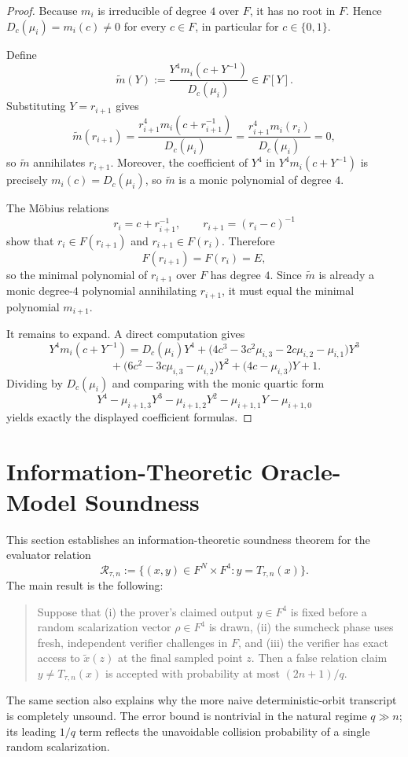 \documentclass[11pt]{article}
\begin{document}
\begin{proof}
Because \(m_i\) is irreducible of degree \(4\) over \(F\), it has no root in \(F\). Hence \(D_c(\mu_i)=m_i(c)\neq 0\) for every \(c\in F\), in particular for \(c\in\{0,1\}\).

Define
\[
\widetilde m(Y):=\frac{Y^4m_i(c+Y^{-1})}{D_c(\mu_i)}\in F[Y].
\]
Substituting \(Y=r_{i+1}\) gives
\[
\widetilde m(r_{i+1})
=
\frac{r_{i+1}^4 m_i(c+r_{i+1}^{-1})}{D_c(\mu_i)}
=
\frac{r_{i+1}^4 m_i(r_i)}{D_c(\mu_i)}
=0,
\]
so \(\widetilde m\) annihilates \(r_{i+1}\). Moreover, the coefficient of \(Y^4\) in \(Y^4m_i(c+Y^{-1})\) is precisely \(m_i(c)=D_c(\mu_i)\), so \(\widetilde m\) is a monic polynomial of degree \(4\).

The M\"obius relations
\[
r_i=c+r_{i+1}^{-1},
\qquad
r_{i+1}=(r_i-c)^{-1}
\]
show that \(r_i\in F(r_{i+1})\) and \(r_{i+1}\in F(r_i)\). Therefore
\[
F(r_{i+1})=F(r_i)=E,
\]
so the minimal polynomial of \(r_{i+1}\) over \(F\) has degree \(4\). Since \(\widetilde m\) is already a monic degree-\(4\) polynomial annihilating \(r_{i+1}\), it must equal the minimal polynomial \(m_{i+1}\).

It remains to expand. A direct computation gives
\[
Y^4m_i(c+Y^{-1})
=
D_c(\mu_i)Y^4
+
\bigl(4c^3-3c^2\mu_{i,3}-2c\mu_{i,2}-\mu_{i,1}\bigr)Y^3
\]
\[
\qquad
+
\bigl(6c^2-3c\mu_{i,3}-\mu_{i,2}\bigr)Y^2
+
\bigl(4c-\mu_{i,3}\bigr)Y
+1.
\]
Dividing by \(D_c(\mu_i)\) and comparing with the monic quartic form
\[
Y^4-\mu_{i+1,3}Y^3-\mu_{i+1,2}Y^2-\mu_{i+1,1}Y-\mu_{i+1,0}
\]
yields exactly the displayed coefficient formulas.
\end{proof}

\section{Information-Theoretic Oracle-Model Soundness}
\label{sec:it-soundness}

This section establishes an information-theoretic soundness theorem for the evaluator relation
\[
\mathcal R_{\tau,n}:=\{(x,y)\in F^N\times F^4 : y=T_{\tau,n}(x)\}.
\]
The main result is the following:
\begin{quote}
Suppose that (i) the prover's claimed output $y\in F^4$ is fixed before a random scalarization vector $\rho\in F^4$ is drawn, (ii) the sumcheck phase uses fresh, independent verifier challenges in $F$, and (iii) the verifier has exact access to $\widetilde x(z)$ at the final sampled point $z$. Then a false relation claim $y\neq T_{\tau,n}(x)$ is accepted with probability at most $(2n+1)/q$.
\end{quote}
The same section also explains why the more naive deterministic-orbit transcript is completely unsound. The error bound is nontrivial in the natural regime $q\gg n$; its leading $1/q$ term reflects the unavoidable collision probability of a single random scalarization.
\end{document}
